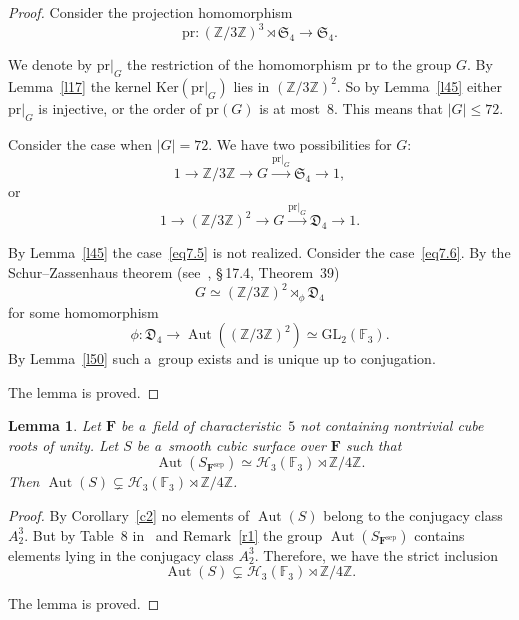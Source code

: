 \documentclass{amsart}
\numberwithin{equation}{section}
\theoremstyle{plain}
\newtheorem{lemma}{Lemma}
\theoremstyle{definition}
\theoremstyle{remark}
\begin{document}
\begin{proof}
Consider the projection homomorphism
$$
\mathrm{pr} \colon (\mathbb{Z}/3\mathbb{Z})^3 \rtimes \mathfrak{S}_4 \to \mathfrak{S}_4.
$$

We denote by $\mathrm{pr}|_{G}$ the restriction of the homomorphism $\mathrm{pr}$ to the group $G$. By Lemma~\ref{l17} the kernel $\mathrm{Ker}(\mathrm{pr}|_{G})$ lies in $(\mathbb{Z}/3\mathbb{Z})^2$. So by Lemma~\ref{l45} either $\mathrm{pr}|_{G}$ is injective, or the order of $\mathrm{pr}(G)$ is at most~$8$. This means that $|G| \leqslant 72$.

Consider the case when $|G|=72$. We have two possibilities for $G$:
\begin{equation}
1 \to \mathbb{Z}/3\mathbb{Z} \to G \xrightarrow{\mathrm{pr}|_{G}} \mathfrak{S}_4 \to 1,
\label{eq7.5}
\end{equation}
or
\begin{equation}
1 \to (\mathbb{Z}/3\mathbb{Z})^2 \to G \xrightarrow{\mathrm{pr}|_{G}} \mathfrak{D}_4 \to 1. \label{eq7.6}
\end{equation}

By Lemma~\ref{l45} the case~\eqref{eq7.5} is not realized. Consider the case~\eqref{eq7.6}. By the Schur--Zassenhaus theorem (see~\cite{9}, \S\,17.4, Theorem~39) $$
G \simeq (\mathbb{Z}/3\mathbb{Z})^2 \rtimes_{\phi} \mathfrak{D}_4
$$
for some homomorphism 
$$
\phi\colon \mathfrak{D}_4 \to \operatorname{Aut}( (\mathbb{Z}/3\mathbb{Z})^2 ) \simeq \mathrm{GL}_2(\mathbb{F}_3).
$$
By Lemma~\ref{l50} such a~group 
exists and is unique up to conjugation.

The lemma is proved.
\end{proof}

\begin{lemma}
\label{l52}
Let $\mathbf{F}$ be a~field of characteristic~$5$ not containing nontrivial cube roots of unity. Let $S$ be a~smooth cubic surface over $\mathbf{F}$ such that
$$
\operatorname{Aut}(S_{\mathbf{F}^{\mathrm{sep}}}) \simeq \mathcal{H}_3(\mathbb{F}_3) \rtimes \mathbb{Z}/4\mathbb{Z}.
$$
Then $\operatorname{Aut}(S) \subsetneq \mathcal{H}_3(\mathbb{F}_3) \rtimes \mathbb{Z}/4\mathbb{Z}$.
\end{lemma}

\begin{proof}
By Corollary~\ref{c2} no elements of $\operatorname{Aut}(S)$ belong to the conjugacy class~$A^3_2$. But by Table~8 in~\cite{8} and Remark~\ref{r1} the group $\operatorname{Aut}(S_{\mathbf{F}^{\mathrm{sep}}})$ contains elements lying in the conjugacy class $A^3_2$. Therefore, we have the strict inclusion
$$
\operatorname{Aut}(S) \subsetneq \mathcal{H}_3(\mathbb{F}_3) \rtimes \mathbb{Z}/4\mathbb{Z}.
$$

The lemma is proved.
\end{proof}
\end{document}
